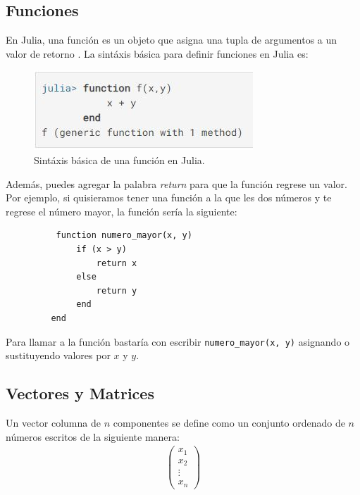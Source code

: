 \subsection{Funciones}
En Julia, una función es un objeto que asigna una tupla de argumentos a un valor de retorno \citep{Julia_manual}. La sintáxis básica para definir funciones en Julia es:

\begin{figure}[h]
\begin{center}
\includegraphics[scale=0.6]{Imagenes/sintaxis_funcion.JPG}
 \caption{Sintáxis básica de una función en Julia.}
  \label{functions_sintax_Julia}
\end{center}
\end{figure}

Además, puedes agregar la palabra \textit{return} para que la función regrese un valor. Por ejemplo, si quisieramos tener una función a la que les dos números y te regrese el número mayor, la función sería la siguiente:

\begin{tcolorbox}
      \begin{verbatim}
          function numero_mayor(x, y)
              if (x > y)
                  return x 
              else
                  return y
              end
         end
      \end{verbatim}
\end{tcolorbox}


Para llamar a la función bastaría con escribir \texttt{numero\_mayor(x, y)} asignando o sustituyendo valores por $x$ y $y$. 

\subsection{Vectores y Matrices}

\begin{definition}
Un vector columna de $n$ componentes se define como un conjunto ordenado de $n$ números escritos de la siguiente manera:
\begin{equation*}
    \begin{aligned}
    \begin{pmatrix}
    x_1 \\ 
    x_2 \\
    \vdots \\
    x_n
    \end{pmatrix} 
    \end{aligned}
\end{equation*}
\end{definition}


